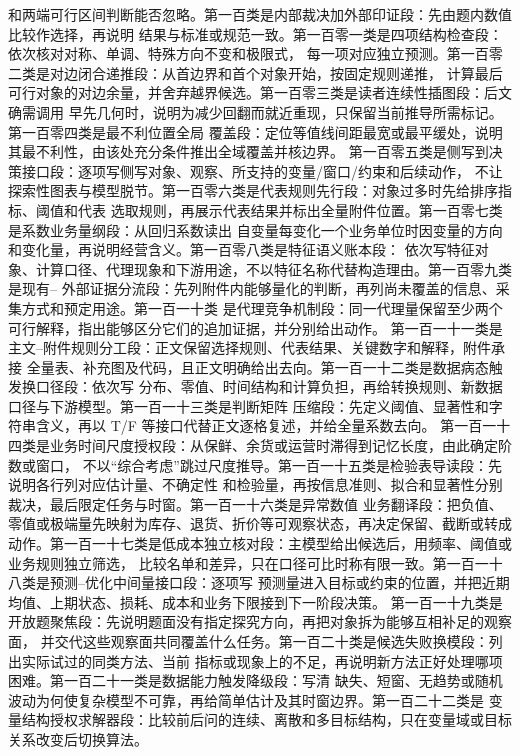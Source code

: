 和两端可行区间判断能否忽略。第一百类是内部裁决加外部印证段：先由题内数值比较作选择，再说明
结果与标准或规范一致。第一百零一类是四项结构检查段：依次核对对称、单调、特殊方向不变和极限式，
每一项对应独立预测。第一百零二类是对边闭合递推段：从首边界和首个对象开始，按固定规则递推，
计算最后可行对象的对边余量，并舍弃越界候选。第一百零三类是读者连续性插图段：后文确需调用
早先几何时，说明为减少回翻而就近重现，只保留当前推导所需标记。第一百零四类是最不利位置全局
覆盖段：定位等值线间距最宽或最平缓处，说明其最不利性，由该处充分条件推出全域覆盖并核边界。
第一百零五类是侧写到决策接口段：逐项写侧写对象、观察、所支持的变量/窗口/约束和后续动作，
不让探索性图表与模型脱节。第一百零六类是代表规则先行段：对象过多时先给排序指标、阈值和代表
选取规则，再展示代表结果并标出全量附件位置。第一百零七类是系数业务量纲段：从回归系数读出
自变量每变化一个业务单位时因变量的方向和变化量，再说明经营含义。第一百零八类是特征语义账本段：
依次写特征对象、计算口径、代理现象和下游用途，不以特征名称代替构造理由。第一百零九类是现有--
外部证据分流段：先列附件内能够量化的判断，再列尚未覆盖的信息、采集方式和预定用途。第一百一十类
是代理竞争机制段：同一代理量保留至少两个可行解释，指出能够区分它们的追加证据，并分别给出动作。
第一百一十一类是主文--附件规则分工段：正文保留选择规则、代表结果、关键数字和解释，附件承接
全量表、补充图及代码，且正文明确给出去向。第一百一十二类是数据病态触发换口径段：依次写
分布、零值、时间结构和计算负担，再给转换规则、新数据口径与下游模型。第一百一十三类是判断矩阵
压缩段：先定义阈值、显著性和字符串含义，再以 T/F 等接口代替正文逐格复述，并给全量系数去向。
第一百一十四类是业务时间尺度授权段：从保鲜、余货或运营时滞得到记忆长度，由此确定阶数或窗口，
不以“综合考虑”跳过尺度推导。第一百一十五类是检验表导读段：先说明各行列对应估计量、不确定性
和检验量，再按信息准则、拟合和显著性分别裁决，最后限定任务与时窗。第一百一十六类是异常数值
业务翻译段：把负值、零值或极端量先映射为库存、退货、折价等可观察状态，再决定保留、截断或转成
动作。第一百一十七类是低成本独立核对段：主模型给出候选后，用频率、阈值或业务规则独立筛选，
比较名单和差异，只在口径可比时称有限一致。第一百一十八类是预测--优化中间量接口段：逐项写
预测量进入目标或约束的位置，并把近期均值、上期状态、损耗、成本和业务下限接到下一阶段决策。
第一百一十九类是开放题聚焦段：先说明题面没有指定探究方向，再把对象拆为能够互相补足的观察面，
并交代这些观察面共同覆盖什么任务。第一百二十类是候选失败换模段：列出实际试过的同类方法、当前
指标或现象上的不足，再说明新方法正好处理哪项困难。第一百二十一类是数据能力触发降级段：写清
缺失、短窗、无趋势或随机波动为何使复杂模型不可靠，再给简单估计及其时窗边界。第一百二十二类是
变量结构授权求解器段：比较前后问的连续、离散和多目标结构，只在变量域或目标关系改变后切换算法。
